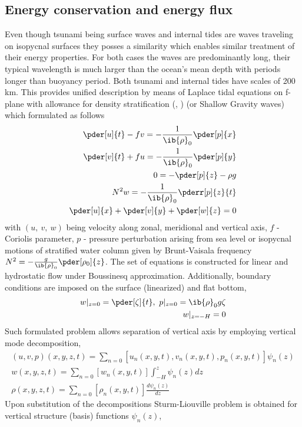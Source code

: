 \subsection{Energy conservation and energy flux}
Even though tsunami being surface waves and internal tides are waves traveling on isopycnal surfaces they posses a similarity which enables similar treatment of their energy properties. For both cases the waves are predominantly long, their typical wavelength is much larger than the ocean's mean depth with periods longer than buoyancy period. Both tsunami and internal tides have scales of 200 km. This provides unified description by means of Laplace tidal equations on f-plane with allowance for density stratification (\cite{kundu2008fluid}, \cite{cushman2011introduction}) (or Shallow Gravity waves) which formulated as follows
\begin{align}
\pder[u]{t} - f v = -\frac{1}{\ib{\rho}_0}\pder[p]{x}\\
\pder[v]{t} + f u = -\frac{1}{\ib{\rho}_0}\pder[p]{y}\\
0 = -\pder[p]{z} - \rho g\\
N^2 w = -\frac{1}{\ib{\rho}_0} \pderr[p]{z}{t}\\
\pder[u]{x} + \pder[v]{y} + \pder[w]{z} = 0
\end{align}
with $(u,~v,~w)$ being velocity along zonal, meridional and vertical axis, $f$ - Coriolis parameter, $p$ - pressure perturbation arising from sea level or isopycnal motions of stratified water column given by Brunt-Vaisala frequency $N^2 = -\frac{g}{\ib{\rho}_0}\pder[\rho_0]{z}$. The set of equations is constructed for linear and hydrostatic flow under Boussinesq approximation. Additionally, boundary conditions are imposed on the surface (linearized) and flat bottom,
\begin{align}
w|_{z = 0} = \pder[\zeta]{t},~p|_{z = 0} = \ib{\rho}_0 g \zeta\\
w|_{z = -H} = 0
\end{align}
Such formulated problem allows separation of vertical axis by employing vertical mode decomposition,
\begin{align}
(u, v, p)(x,y,z,t) = \sum_{n = 0} [u_n(x,y,t), v_n(x,y,t), p_n(x,y,t)]\psi_n(z)\\
w(x,y,z,t) = \sum_{n = 0} [w_n(x,y,t)] \int_{-H}^z \psi_n(z) dz\\
\rho(x,y,z,t) = \sum_{n = 0} [\rho_n(x,y,t)] \frac{d \psi_n(z)}{dz}
\end{align}
Upon substitution of the decompositions Sturm-Liouville problem is obtained for vertical structure (basis) functions $\psi_n(z)$,

